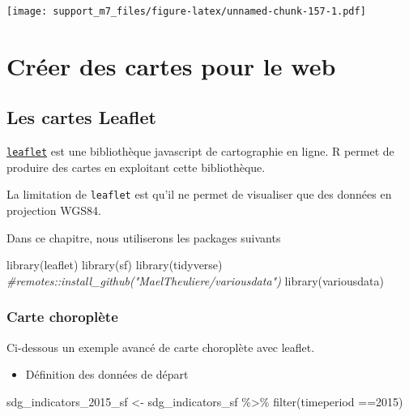 \documentclass[
]{book}
\newenvironment{Shaded}{\begin{snugshade}}{\end{snugshade}}
\newcommand{\CommentTok}[1]{\textcolor[rgb]{0.56,0.35,0.01}{\textit{#1}}}
\newcommand{\DecValTok}[1]{\textcolor[rgb]{0.00,0.00,0.81}{#1}}
\newcommand{\FunctionTok}[1]{\textcolor[rgb]{0.00,0.00,0.00}{#1}}
\newcommand{\NormalTok}[1]{#1}
\newcommand{\OtherTok}[1]{\textcolor[rgb]{0.56,0.35,0.01}{#1}}
\newcommand{\SpecialCharTok}[1]{\textcolor[rgb]{0.00,0.00,0.00}{#1}}
\providecommand{\tightlist}{%
  \setlength{\itemsep}{0pt}\setlength{\parskip}{0pt}}
\begin{document}
\texttt{[image: support\_m7\_files/figure-latex/unnamed-chunk-157-1.pdf]}

\hypertarget{cruxe9er-des-cartes-pour-le-web}{%
\chapter{Créer des cartes pour le web}\label{cruxe9er-des-cartes-pour-le-web}}

\hypertarget{les-cartes-leaflet}{%
\section{Les cartes Leaflet}\label{les-cartes-leaflet}}

\href{https://leafletjs.com/}{\texttt{leaflet}} est une bibliothèque javascript de cartographie en ligne. R permet de produire des cartes en exploitant cette bibliothèque.

La limitation de \texttt{leaflet} est qu'il ne permet de visualiser que des données en projection WGS84.

Dans ce chapitre, nous utiliserons les packages suivants

\begin{Shaded}
\begin{Highlighting}[]
\FunctionTok{library}\NormalTok{(leaflet)}
\FunctionTok{library}\NormalTok{(sf)}
\FunctionTok{library}\NormalTok{(tidyverse)}
\CommentTok{\#remotes::install\_github("MaelTheuliere/variousdata")}
\FunctionTok{library}\NormalTok{(variousdata)}
\end{Highlighting}
\end{Shaded}

\hypertarget{carte-choropluxe8te}{%
\subsection{Carte choroplète}\label{carte-choropluxe8te}}

Ci-dessous un exemple avancé de carte choroplète avec leaflet.

\begin{itemize}
\tightlist
\item
  Définition des données de départ
\end{itemize}

\begin{Shaded}
\begin{Highlighting}[]
\NormalTok{sdg\_indicators\_2015\_sf }\OtherTok{\textless{}{-}}\NormalTok{ sdg\_indicators\_sf }\SpecialCharTok{\%\textgreater{}\%} 
  \FunctionTok{filter}\NormalTok{(timeperiod }\SpecialCharTok{==}\DecValTok{2015}\NormalTok{)}
\end{Highlighting}
\end{Shaded}
\end{document}
